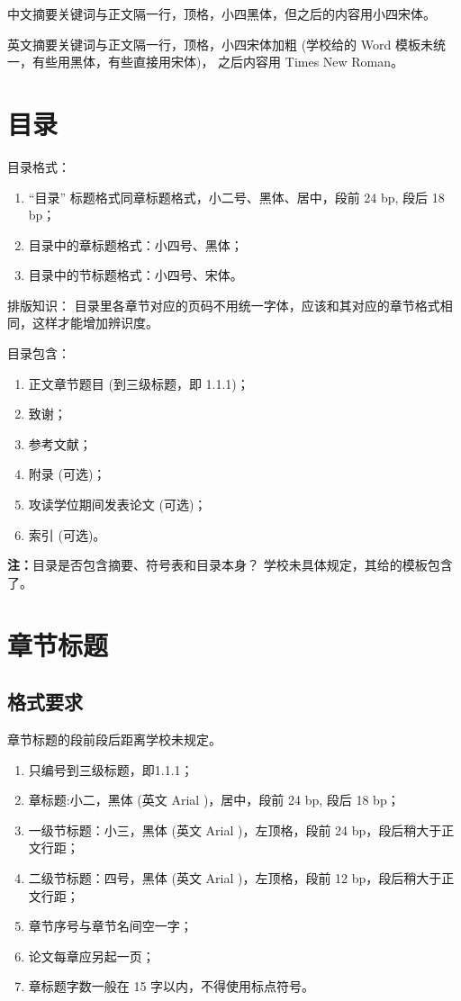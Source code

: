 中文摘要关键词与正文隔一行，顶格，小四黑体，但之后的内容用小四宋体。

英文摘要关键词与正文隔一行，顶格，小四宋体加粗 (学校给的 Word 模板未统一，有些用黑体，有些直接用宋体)，
之后内容用 Times New Roman。

\section{目录}

目录格式：

\begin{enumerate}
	\item ``目录'' 标题格式同章标题格式，小二号、黑体、居中，段前 24 bp, 段后 18 bp；
	\item 目录中的章标题格式：小四号、黑体；
	\item 目录中的节标题格式：小四号、宋体。
\end{enumerate}

\textsf{排版知识：} 目录里各章节对应的页码不用统一字体，应该和其对应的章节格式相同，这样才能增加辨识度。

目录包含：

\begin{enumerate}
	\item 正文章节题目 (到三级标题，即 1.1.1)；
	\item 致谢；
	\item 参考文献；
	\item 附录 (可选)；
	\item 攻读学位期间发表论文 (可选)；
	\item 索引 (可选)。
\end{enumerate}

\textbf{注：}目录是否包含摘要、符号表和目录本身？ 学校未具体规定，其给的模板包含了。

\section{章节标题}

\subsection{格式要求}

章节标题的段前段后距离学校未规定。

\begin{enumerate}
	\item 只编号到三级标题，即1.1.1；
	\item	章标题:小二，黑体 (英文 Arial )，居中，段前 24 bp, 段后 18 bp；
	\item 一级节标题：小三，黑体 (英文 Arial )，左顶格，段前 24 bp，段后稍大于正文行距；
	\item 二级节标题：四号，黑体 (英文 Arial )，左顶格，段前 12 bp，段后稍大于正文行距；
	\item 章节序号与章节名间空一字；
	\item 论文每章应另起一页；
	\item 章标题字数一般在 15 字以内，不得使用标点符号。
\end{enumerate}

